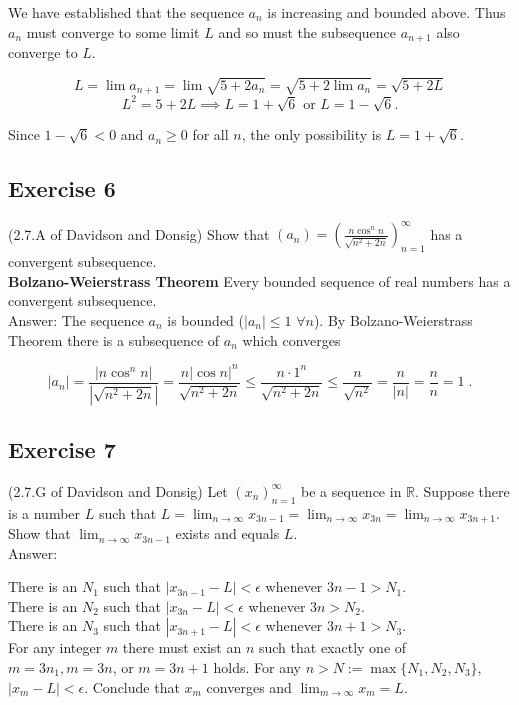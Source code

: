 \documentclass{article}
\begin{document}
We have established that the sequence $a_n$ is increasing and bounded above. Thus $a_n$ must converge to some limit $L$ and so must the subsequence $a_{n+1}$ also converge to $L$.

$$L = \lim a_{n+1} = \lim \sqrt{5+2a_n} = \sqrt{5+2\lim a_n} = \sqrt{5+2L}$$
$$
L^2 = 5+2L \implies L = 1+\sqrt{6} \text { or } L = 1-\sqrt{6}.
$$

Since $1-\sqrt{6} < 0$ and $a_n \geq 0$ for all $n$, the only possibility is $L = 1+\sqrt{6}$. 

\subsection*{Exercise 6}

(2.7.A of Davidson and Donsig) Show that $(a_n) = \left(\frac{n \cos^n n}{\sqrt{n^2+2n}}\right)_{n=1}^\infty$ has a convergent subsequence. \\

{\bf Bolzano-Weierstrass Theorem} Every bounded sequence of real numbers has a convergent subsequence. \\

Answer: The sequence $a_n$ is bounded ($|a_n| \leq 1$ $\forall n$). By Bolzano-Weierstrass Theorem there is a subsequence of $a_n$ which converges

$$
|a_n| = \frac{|n \cos^n n|}{|\sqrt{n^2+2n}|} = \frac{n|\cos n|^n}{\sqrt{n^2+2n}} \leq \frac{n \cdot 1^n}{\sqrt{n^2+2n}} \leq \frac{n}{\sqrt{n^2}} = \frac{n}{|n|} = \frac{n}{n} = 1\;.
$$

\subsection*{Exercise 7}

(2.7.G of Davidson and Donsig) Let $(x_n)_{n=1}^\infty$ be a sequence in $\mathbb{R}$. Suppose there is a number $L$ such that $L = \lim_{n\rightarrow \infty} x_{3n-1} = \lim_{n\rightarrow \infty} x_{3n} = \lim_{n\rightarrow \infty} x_{3n+1}$. Show that $\lim_{n\rightarrow \infty} x_{3n-1}$ exists and equals $L$. \\

Answer:

There is an $N_1$ such that $|x_{3n-1} - L| < \epsilon$ whenever $3n-1 > N_1$. \\

There is an $N_2$ such that $|x_{3n} - L| < \epsilon$ whenever $3n > N_2$. \\

There is an $N_3$ such that $|x_{3n+1} - L| < \epsilon$ whenever $3n+1 > N_3$. \\

For any integer $m$ there must exist an $n$ such that exactly one of $m = 3n_1, m = 3n$, or $m = 3n+1$ holds. For any $n > N:= \max \{N_1, N_2, N_3\}$, $|x_m - L| < \epsilon$. Conclude that $x_m$ converges and $\lim_{m\rightarrow \infty} x_m = L$. 
\end{document}
